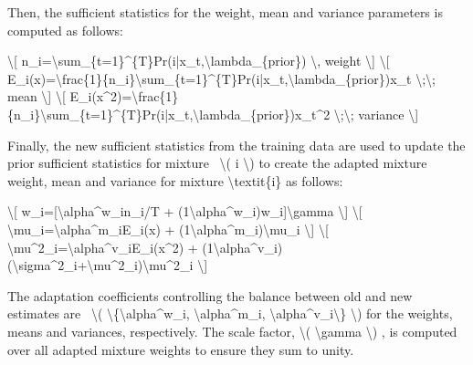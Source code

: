\documentclass[letterpaper,10pt,english]{jupyterBook}
\begin{document}
\sphinxAtStartPar
Then, the sufficient statistics for the weight, mean and variance
parameters is computed as follows:

\sphinxAtStartPar
\textbackslash{}{[} n\_i=\textbackslash{}sum\_\{t=1\}\textasciicircum{}\{T\}Pr(i|x\_t,\textbackslash{}lambda\_\{prior\}) \textbackslash{}, weight \textbackslash{}{]}
\textbackslash{}{[}
E\_i(x)=\textbackslash{}frac\{1\}\{n\_i\}\textbackslash{}sum\_\{t=1\}\textasciicircum{}\{T\}Pr(i|x\_t,\textbackslash{}lambda\_\{prior\})x\_t
\textbackslash{};\textbackslash{}; mean \textbackslash{}{]} \textbackslash{}{[}
E\_i(x\textasciicircum{}2)=\textbackslash{}frac\{1\}\{n\_i\}\textbackslash{}sum\_\{t=1\}\textasciicircum{}\{T\}Pr(i|x\_t,\textbackslash{}lambda\_\{prior\})x\_t\textasciicircum{}2
\textbackslash{};\textbackslash{}; variance \textbackslash{}{]}

\sphinxAtStartPar
Finally, the new sufficient statistics from the training data are used
to update the prior sufficient statistics for mixture  \textbackslash{}( i \textbackslash{}) to
create the adapted mixture weight, mean and variance for mixture
\textbackslash{}textit\{i\} as follows:

\sphinxAtStartPar
\textbackslash{}{[} w\_i={[}\textbackslash{}alpha\textasciicircum{}w\_in\_i/T + (1\sphinxhyphen{}\textbackslash{}alpha\textasciicircum{}w\_i)w\_i{]}\textbackslash{}gamma \textbackslash{}{]} \textbackslash{}{[}
\textbackslash{}mu\_i=\textbackslash{}alpha\textasciicircum{}m\_iE\_i(x) + (1\sphinxhyphen{}\textbackslash{}alpha\textasciicircum{}m\_i)\textbackslash{}mu\_i \textbackslash{}{]} \textbackslash{}{[}
\textbackslash{}mu\textasciicircum{}2\_i=\textbackslash{}alpha\textasciicircum{}v\_iE\_i(x\textasciicircum{}2) +
(1\sphinxhyphen{}\textbackslash{}alpha\textasciicircum{}v\_i)(\textbackslash{}sigma\textasciicircum{}2\_i+\textbackslash{}mu\textasciicircum{}2\_i)\sphinxhyphen{}\textbackslash{}mu\textasciicircum{}2\_i \textbackslash{}{]}

\sphinxAtStartPar
The adaptation coefficients controlling the balance between old and new
estimates are  \textbackslash{}( \textbackslash{}\{\textbackslash{}alpha\textasciicircum{}w\_i, \textbackslash{}alpha\textasciicircum{}m\_i, \textbackslash{}alpha\textasciicircum{}v\_i\textbackslash{}\} \textbackslash{}) for
the weights, means and variances, respectively. The scale factor, \textbackslash{}(
\textbackslash{}gamma \textbackslash{}) , is computed over all adapted mixture weights to ensure
they sum to unity.
\end{document}
